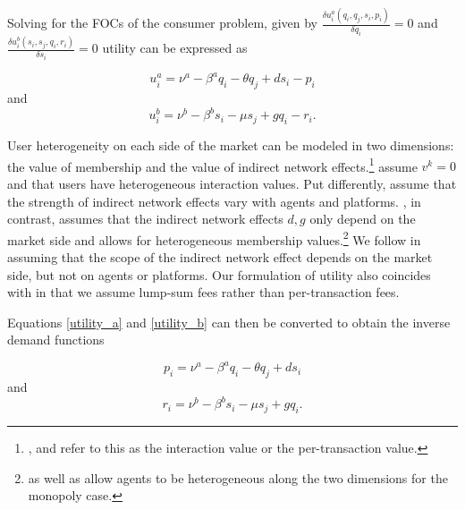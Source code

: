 \documentclass[12pt,a4paper,notitlepage]{article}
\begin{document}
Solving for the FOCs of the consumer problem, given by $\frac{\delta u_i^a(q_i,q_j,s_i,p_i)}{\delta q_i}=0$ and  $\frac{\delta u_i^b(s_i,s_j,q_i,r_i)}{\delta s_i}=0$ utility can be expressed as

\begin{equation}\label{utility_a}
u_i^a = \nu^a-\beta^a q_i - \theta q_j +ds_i - p_i
\end{equation}
and
\begin{equation}\label{utility_b}
u_i^b=\nu^b-\beta^b s_i - \mu s_j +gq_i - r_i.
\end{equation} 

User heterogeneity on each side of the market can be modeled in two dimensions: the value of membership and the value of indirect network effects.\footnote{\cite{weyl_price_2010}, \cite{rochet_platform_2003} and \cite{armstrong_competition_2006} refer to this as the interaction value or the per-transaction value.} \cite{rochet_platform_2003} assume $v^k=0$ and that users have heterogeneous interaction values. Put differently, \cite{rochet_platform_2003} assume that the strength of indirect network effects vary with agents and platforms. \cite{armstrong_competition_2006}, in contrast, assumes that the indirect network effects $d,g$ only depend on the market side and allows for heterogeneous membership values.\footnote{\cite{rochet_platform_2003} as well as \cite{weyl_price_2010} allow agents to be heterogeneous along the two dimensions for the monopoly case.} We follow \cite{armstrong_competition_2006} in assuming that the scope of the indirect network effect depends on the market side, but not on agents or platforms. Our formulation of utility also coincides with \cite{armstrong_competition_2006} in that we assume lump-sum fees rather than per-transaction fees. 

Equations \ref{utility_a} and \ref{utility_b} can then be converted to obtain the inverse demand functions

\begin{equation}
p_i=\nu^a-\beta^a q_i - \theta q_j +ds_i
\end{equation}
and
\begin{equation}
r_i=\nu^b-\beta^b s_i - \mu s_j +gq_i.
\end{equation} 
\end{document}
